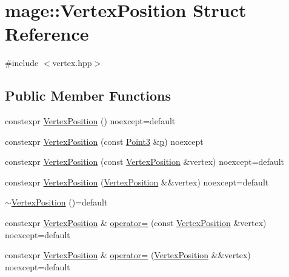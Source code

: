 \hypertarget{structmage_1_1_vertex_position}{}\section{mage\+:\+:Vertex\+Position Struct Reference}
\label{structmage_1_1_vertex_position}


{\ttfamily \#include $<$vertex.\+hpp$>$}

\subsection*{Public Member Functions}
\begin{DoxyCompactItemize}
\item 
constexpr \hyperlink{structmage_1_1_vertex_position_a3d6367a3f555b5003e33132dfd77c1f0}{Vertex\+Position} () noexcept=default
\item 
constexpr \hyperlink{structmage_1_1_vertex_position_abee8a097ada3b0cbdec6c559f2393b0a}{Vertex\+Position} (const \hyperlink{structmage_1_1_point3}{Point3} \&\hyperlink{structmage_1_1_vertex_position_ad9c3ea68e2c1745446387d1eca28f25f}{p}) noexcept
\item 
constexpr \hyperlink{structmage_1_1_vertex_position_a4f050c756f48e216f1bf540c8ec252aa}{Vertex\+Position} (const \hyperlink{structmage_1_1_vertex_position}{Vertex\+Position} \&vertex) noexcept=default
\item 
constexpr \hyperlink{structmage_1_1_vertex_position_a0198bb4e4d5ec39224a6e9b9dbf52ac0}{Vertex\+Position} (\hyperlink{structmage_1_1_vertex_position}{Vertex\+Position} \&\&vertex) noexcept=default
\item 
\hyperlink{structmage_1_1_vertex_position_ae78ac5fd76f3217ec72435beaa34ed6e}{$\sim$\+Vertex\+Position} ()=default
\item 
constexpr \hyperlink{structmage_1_1_vertex_position}{Vertex\+Position} \& \hyperlink{structmage_1_1_vertex_position_a1d4d4c85a0aaae40a7d7d50f9873f6ef}{operator=} (const \hyperlink{structmage_1_1_vertex_position}{Vertex\+Position} \&vertex) noexcept=default
\item 
constexpr \hyperlink{structmage_1_1_vertex_position}{Vertex\+Position} \& \hyperlink{structmage_1_1_vertex_position_af0ff6c62f29e2170e93fb50cfe713c3a}{operator=} (\hyperlink{structmage_1_1_vertex_position}{Vertex\+Position} \&\&vertex) noexcept=default
\end{DoxyCompactItemize}
